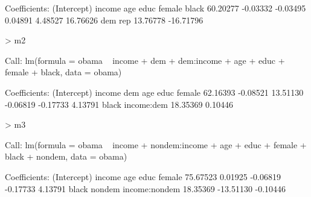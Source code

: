 \documentclass[12pt]{article}
\begin{document}
\begin{enumerate}
\begin{Schunk}
\begin{Soutput}
Coefficients:
(Intercept)       income          age         educ       female        black  
   60.20277     -0.03332     -0.03495      0.04891      4.48527     16.76626  
        dem          rep  
   13.76778    -16.71796  
\end{Soutput}
\begin{Sinput}
> m2
\end{Sinput}
\begin{Soutput}
Call:
lm(formula = obama ~ income + dem + dem:income + age + educ + 
    female + black, data = obama)

Coefficients:
(Intercept)       income          dem          age         educ       female  
   62.16393     -0.08521     13.51130     -0.06819     -0.17733      4.13791  
      black   income:dem  
   18.35369      0.10446  
\end{Soutput}
\begin{Sinput}
> m3
\end{Sinput}
\begin{Soutput}
Call:
lm(formula = obama ~ income + nondem:income + age + educ + female + 
    black + nondem, data = obama)

Coefficients:
  (Intercept)         income            age           educ         female  
     75.67523        0.01925       -0.06819       -0.17733        4.13791  
        black         nondem  income:nondem  
     18.35369      -13.51130       -0.10446  
\end{Soutput}
\end{Schunk}


\end{enumerate}
\end{document}
